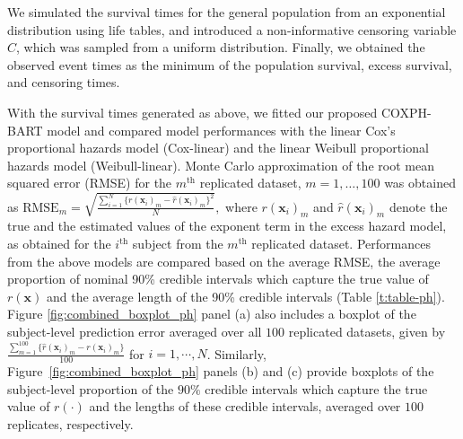 \documentclass[12pt]{article}
\begin{document}
We simulated the survival times for the general population  from an exponential distribution using life tables, and introduced a non-informative censoring variable $C$, which was sampled from a uniform distribution. Finally, we obtained the observed event times as the minimum of the population survival, excess survival, and censoring times. 

With the survival times generated as above, we fitted our proposed COXPH-BART model and compared model performances with the linear Cox's proportional hazards model (Cox-linear) and the linear Weibull proportional hazards model (Weibull-linear). Monte Carlo approximation of the root mean squared error (RMSE) for the $m^{\text{th}}$ replicated dataset, $m=1,\dots,100$ was obtained as $\text{RMSE}_m = \sqrt{\frac{\sum_{i=1}^{N}\{ r(\mathbf{x}_{i})_m - \widehat{r}(\mathbf{x}_{i})_m\}^2}{N}},$ where $r(\mathbf{x}_{i})_m$ and $\widehat{r}(\mathbf{x}_{i})_m$ denote the true and the estimated values of the exponent term in the excess hazard model, as obtained for the $i^{\text{th}}$ subject from the $m^{\text{th}}$ replicated dataset. Performances from the above models are compared based on the average RMSE, the average proportion of nominal 90\% credible intervals which capture the true value of $r(\mathbf{x})$ and the average length of the 90\% credible intervals (Table \ref{t:table-ph}). 
Figure \ref{fig:combined_boxplot_ph} panel (a) also includes a boxplot of the subject-level prediction error averaged over all $100$ replicated datasets, given by $\frac{\sum_{m=1}^{100}\{\widehat r(\mathbf{x}_i)_m - r(\mathbf{x}_i)_m\}}{100}$ for $i=1, \cdots, N$. Similarly, Figure~\ref{fig:combined_boxplot_ph} panels (b) and (c) provide boxplots of the subject-level proportion of the $90\%$ credible intervals which capture the true value of $r(\cdot)$ and the lengths of these credible intervals, averaged over $100$ replicates, respectively. 
\end{document}
